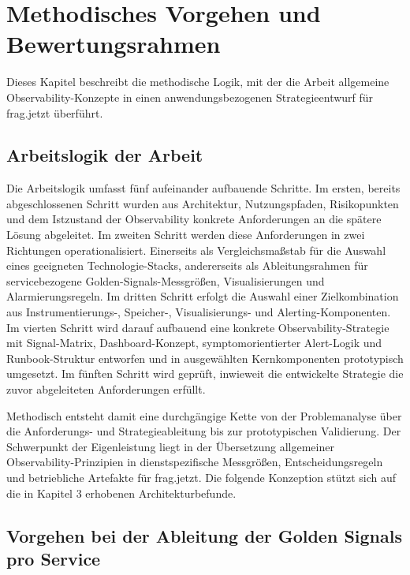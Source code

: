  
\chapter{Methodisches Vorgehen und Bewertungsrahmen}
 
Dieses Kapitel beschreibt die methodische Logik, mit der die Arbeit allgemeine Observability-Konzepte in einen anwendungsbezogenen Strategieentwurf für frag.jetzt überführt. 
 
\section{Arbeitslogik der Arbeit}

Die Arbeitslogik umfasst fünf aufeinander aufbauende Schritte. Im ersten, bereits abgeschlossenen Schritt wurden aus Architektur, Nutzungspfaden, Risikopunkten und dem Istzustand der Observability konkrete Anforderungen an die spätere Lösung abgeleitet. Im zweiten Schritt werden diese Anforderungen in zwei Richtungen operationalisiert. Einerseits als Vergleichsmaßstab für die Auswahl eines geeigneten Technologie-Stacks, andererseits als Ableitungsrahmen für servicebezogene Golden-Signals-Messgrößen, Visualisierungen und Alarmierungsregeln. Im dritten Schritt erfolgt die Auswahl einer Zielkombination aus Instrumentierungs-, Speicher-, Visualisierungs- und Alerting-Komponenten. Im vierten Schritt wird darauf aufbauend eine konkrete Observability-Strategie mit Signal-Matrix, Dashboard-Konzept, symptomorientierter Alert-Logik und Runbook-Struktur entworfen und in ausgewählten Kernkomponenten prototypisch umgesetzt. Im fünften Schritt wird geprüft, inwieweit die entwickelte Strategie die zuvor abgeleiteten Anforderungen erfüllt.

Methodisch entsteht damit eine durchgängige Kette von der Problemanalyse über die Anforderungs- und Strategieableitung bis zur prototypischen Validierung. Der Schwerpunkt der Eigenleistung liegt in der Übersetzung allgemeiner Observability-Prinzipien in dienstspezifische Messgrößen, Entscheidungsregeln und betriebliche Artefakte für frag.jetzt. Die folgende Konzeption stützt sich auf die in Kapitel 3 erhobenen Architekturbefunde.
 
 
\section{Vorgehen bei der Ableitung der Golden Signals pro Service}
 
